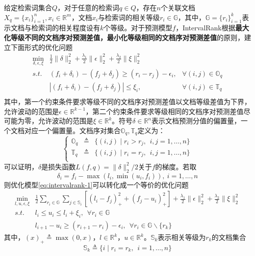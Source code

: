 给定检索词集合$Q$，对于任意的检索词$q\in Q$，存在$n$个关联文档$X_q=\{x_i\}_{i=1}^n, x_i\in \mathbb{R}^m$，文档$x_i$与检索词的相关等级$r_i\in \mathbb{G}$，其中，$\mathbb{G} = \{r_i\}_{i=1}^k$表示文档与检索词的相关程度设有$k$个等级。对于预测模型$f$，IntervalRank根据\textbf{最大化等级不同的文档序对预测差值，最小化等级相同的文档序对预测差值}的原则，建立下面形式的优化问题
\begin{equation}\label{eq:intervalrank-1}
    \begin{array}{lll}
      \min\limits_{\delta, \epsilon, \xi} & \frac{1}{2} \| \delta \|_2^2 + \frac{\lambda_1}{2} \| \epsilon\|_2^2 + \frac{\lambda_2}{2}\|\xi\|_2^2 & \\
      \textit{s.t.} & (f_i + \delta_i) - (f_j + \delta_j) \ge (r_i - r_j) - \epsilon_i, &  \forall (i,j)\in \mathbb{O}_q\\
       & |(f_i + \delta_i) - (f_j + \delta_j)| \le \xi_i, & \forall (i,j)\in \mathbb{T}_q\\
    \end{array}
\end{equation}
其中，第一个约束条件要求等级不同的文档序对预测差值以文档等级差值为下界，允许波动的范围是$\epsilon\in \mathbb{R}^{k-1}$，第二个约束条件要求等级相同的文档序对预测差值尽可能为零，允许波动的范围是$\xi \in \mathbb{R}^k$。符号$\delta\in \mathbb{R}^n$表示文档预测分值的偏置量，一个文档对应一个偏置量。文档序对集合$\mathbb{O}_q,\mathbb{T}_q$定义为：
\begin{equation}
    \left\{
    \begin{array}{lll}
      \mathbb{O}_q & \triangleq & \{(i, j) \mid r_i > r_j,~~i,j=1,\ldots,n\} \\
      \mathbb{T}_q & \triangleq & \{(i, j) \mid r_i = r_j,~~i,j=1,\ldots,n\} \\
    \end{array}
    \right.
\end{equation}
可以证明，$\delta$是损失函数$L(f,q)=\|\delta\|_2^2/2$关于$f$的梯度。若取
\begin{equation}\label{eq:intervalrank-pseudoresponds}
    \delta_i = f_i - \max(l_i,\min(u_i,f_i)),~i=1,\ldots,n
\end{equation}
则优化模型\eqref{eq:intervalrank-1}可以转化成一个等价的优化问题
\begin{equation}\label{eq:intervalrank-eqiv}
    \begin{array}{ll}
      \min\limits_{l,u,\epsilon,\xi} & \frac{1}{2} \sum\limits_{r_i\in \mathbb{G}}\sum\limits_{j\in \mathbb{S}_i} [(l_i - f_j)_{+}^2 + (f_j - u_i)_{+}^2] + \frac{\lambda_1}{2} \| \epsilon\|_2^2 + \frac{\lambda_2}{2}\|\xi\|_2^2 \\
      \textit{s.t.} & l_i \le u_i \le l_i + \xi_i, ~~\forall r_i \in \mathbb{G}\\
       & l_{i+1} - u_i \ge (r_{i+1} - r_i) - \epsilon_i, ~~ \forall r_i \in \mathbb{G} \backslash \{r_k\}
    \end{array}
\end{equation}
其中，$(x)_{+} \triangleq \max(0,x)$，$l\in \mathbb{R}^k$，$u\in \mathbb{R}^k$。$\mathbb{S}_k$表示相关等级为$r_k$的文档集合
\begin{equation}
      \mathbb{S}_k \triangleq \{i \mid r_i = r_k, ~~i=1,\ldots,n\}
\end{equation}

